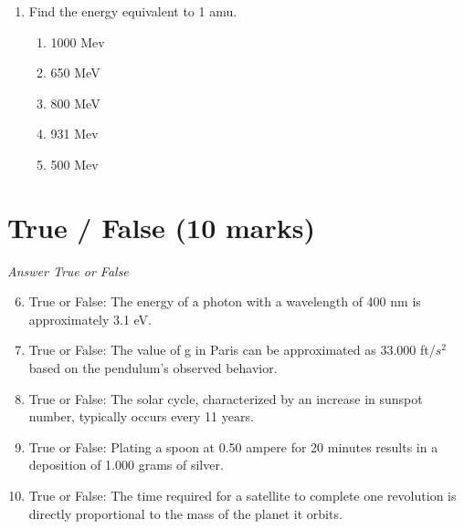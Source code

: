 \documentclass[12pt]{article}
\begin{document}
\begin{enumerate}[label=\arabic*.]
\begin{enumerate}[label=(\alph*)]
    \item frequency decreases, the wavelength increases, and the speed does not change
    \item frequency increases, the wavelength increases, and the speed decreases
    \item frequency increases, the wavelength does not change, and the speed increases
    \item frequency increases, the wavelength decreases, and the speed does not change
\end{enumerate}
\item Find the energy equivalent to 1 amu.
\begin{enumerate}[label=(\alph*)]
    \item 1000 Mev
    \item 650 MeV
    \item 800 MeV
    \item 931 Mev
    \item 500 Mev
\end{enumerate}
\end{enumerate}

\section*{True / False (10 marks)}
\textit{Answer True or False}
\begin{enumerate}[label=\arabic*.]
\setcounter{enumi}{5}
\item True or False: The energy of a photon with a wavelength of 400 nm is approximately 3.1 eV.
\item True or False: The value of g in Paris can be approximated as 33.000 ft/$s^2$ based on the pendulum's observed behavior.
\item True or False: The solar cycle, characterized by an increase in sunspot number, typically occurs every 11 years.
\item True or False: Plating a spoon at 0.50 ampere for 20 minutes results in a deposition of 1.000 grams of silver.
\item True or False: The time required for a satellite to complete one revolution is directly proportional to the mass of the planet it orbits.
\end{enumerate}
\end{document}

